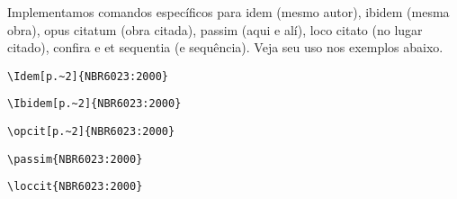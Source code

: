 \documentclass[espacosimples]{abnt}
\newcommand{\VerbL}{0.54\textwidth}
\newcommand{\LatL}{0.45\textwidth}
\begin{document}
Implementamos comandos específicos para idem (mesmo autor),
ibidem (mesma obra), opus citatum (obra citada), passim (aqui e alí),
loco citato (no lugar citado), confira e et sequentia (e sequência).
Veja seu uso nos exemplos abaixo.

\noindent\begin{minipage}[t]{\VerbL}\small\begin{verbatim}
\Idem[p.~2]{NBR6023:2000}
\end{verbatim}\end{minipage}\begin{minipage}[t]{\LatL}\small
{}
\end{minipage}

\noindent\begin{minipage}[t]{\VerbL}\small\begin{verbatim}
\Ibidem[p.~2]{NBR6023:2000}
\end{verbatim}\end{minipage}\begin{minipage}[t]{\LatL}\small
{}
\end{minipage}

\noindent\begin{minipage}[t]{\VerbL}\small\begin{verbatim}
\opcit[p.~2]{NBR6023:2000}
\end{verbatim}\end{minipage}\begin{minipage}[t]{\LatL}\small
{}
\end{minipage}

\noindent\begin{minipage}[t]{\VerbL}\small\begin{verbatim}
\passim{NBR6023:2000}
\end{verbatim}\end{minipage}\begin{minipage}[t]{\LatL}\small
{}
\end{minipage}

\noindent\begin{minipage}[t]{\VerbL}\small\begin{verbatim}
\loccit{NBR6023:2000}
\end{verbatim}\end{minipage}\begin{minipage}[t]{\LatL}\small
{}
\end{minipage}
\end{document}
